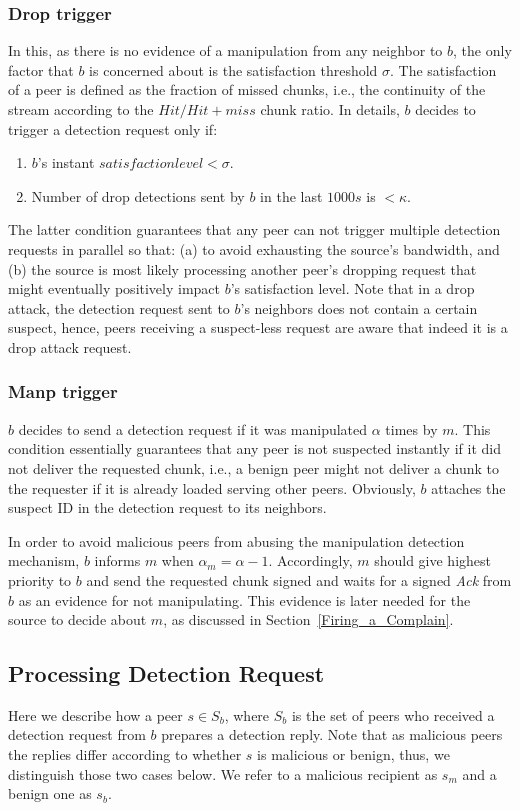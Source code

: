 \subsubsection*{Drop trigger}
In this, as there is no evidence of a manipulation from any neighbor to $b$, the only factor that $b$ is concerned about is the satisfaction threshold $\sigma$.
The satisfaction of a peer is defined as the fraction of missed chunks, i.e., the continuity of the stream according to the $Hit/Hit+miss$ chunk ratio.
In details, $b$ decides to trigger a detection request only if:
\begin{enumerate}
 \item $b$'s instant $satisfaction level < \sigma$.
 \item Number of drop detections sent by $b$ in the last $1000s$ is $< \kappa$.
\end{enumerate}
The latter condition guarantees that any peer can not trigger multiple detection requests in parallel so that: (a) to avoid exhausting the source's bandwidth, and (b) the source is most likely processing another peer's dropping request that might eventually positively impact $b$'s satisfaction level.
Note that in a drop attack, the detection request sent to $b$'s neighbors does not contain a certain suspect, hence, peers receiving a suspect-less request are aware that indeed it is a drop attack request.

\subsubsection*{Manp trigger}
$b$ decides to send a detection request if it was manipulated $\alpha$ times by $m$.
This condition essentially guarantees that any peer is not suspected instantly if it did not deliver the requested chunk, i.e., a benign peer might not deliver a chunk to the requester if it is already loaded serving other peers.
Obviously, $b$ attaches the suspect ID in the detection request to its neighbors.

In order to avoid malicious peers from abusing the manipulation detection mechanism, $b$ informs $m$ when $\alpha_m = \alpha -1$.
Accordingly, $m$ should give highest priority to $b$ and send the requested chunk signed and waits for a signed \textit{Ack} from $b$ as an evidence for not manipulating.
This evidence is later needed for the source to decide about $m$, as discussed in Section~\ref{Firing_a_Complain}.

\subsection{Processing Detection Request}
Here we describe how a peer $s \in S_b$, where $S_b$ is the set of peers who received a detection request from $b$ prepares a detection reply.
Note that as malicious peers the replies differ according to whether $s$ is malicious or benign, thus, we distinguish those two cases below. We refer to a malicious recipient as $s_m$ and a benign one as $s_b$.

